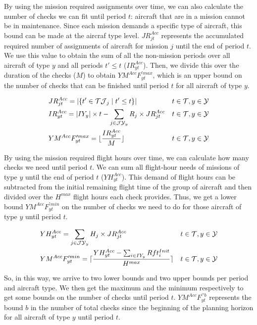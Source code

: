 \documentclass[a4paper,onecolumn,fleqn]{article}
\begin{document}
  By using the mission required assignments over time, we can also calculate the number of checks we can fit until period $t$: aircraft that are in a mission cannot be in maintenance. Since each mission demands a specific type of aircraft, this bound can be made at the aircraf type level. $JR^{Acc}_{jt}$ represents the accumulated required number of assignments of aircraft for mission $j$ until the end of period $t$.
  We use this value to obtain the sum of all the non-mission periods over all aircraft of type $y$ and all periods $t' \le t$ ($IR^{Acc}_{yt}$). Then, we divide this over the duration of the checks ($M$) to obtain $YM^{Acc}F^{\prime max}_{yt}$, which is an upper bound on the number of checks that can be finished until period $t$ for all aircraft of type $y$.

  \begin{align}
    & JR^{Acc}_{jt} = |\{t' \in \mathcal{TJ}_j \mid t' \le t\}| 
        & t \in \mathcal{T}, y \in \mathcal{Y}\notag\\
    & IR^{Acc}_{yt} = |IY_y| \times t -  \sum_{j \in \mathcal{JY}_y} R_j \times JR^{Acc}_{jt} 
        & t \in \mathcal{T}, y \in \mathcal{Y}\notag\\
    & YM^{Acc}F^{\prime max}_{yt} = \lfloor \frac{IR^{Acc}_{yt}}{M} \rfloor 
        & t \in \mathcal{T}, y \in \mathcal{Y}\notag
  \end{align}

  By using the mission required flight hours over time, we can calculate how many checks we need until period $t$. We can sum all flight-hour needs of missions of type $y$ until the end of period $t$ ($YH^{Acc}_{yt}$). This demand of flight hours can be subtracted from the initial remaining flight time of the group of aircraft and then divided over the $H^{max}$ flight hours each check provides. Thus, we get a lower bound $YM^{Acc}F^{\prime min}_{yt}$ on the number of checks we need to do for those aircraft of type $y$ until period $t$.

  \begin{align}
    & YH^{Acc}_{yt} =  \sum_{j \in \mathcal{JY}_y} H_j \times JR^{Acc}_{jt} 
        & t \in \mathcal{T}, y \in \mathcal{Y} \notag\\
    & YM^{Acc}F^{\prime min}_{yt} =  \lceil \frac{YH^{Acc}_{yt} - \sum_{i \in IY_y} Rft^{Init}_i }{H^{max}} \rceil
        & t \in \mathcal{T}, y \in \mathcal{Y} \notag
  \end{align}

  So, in this way, we arrive to two lower bounds and two upper bounds per period and aircraft type. We then get the maximum and the minimum respectively to get some bounds on the number of checks until period $t$. $YM^{Acc}F^{\prime\prime b}_{yt}$ represents the bound $b$ in the number of total checks since the beginning of the planning horizon for all aircraft of type $y$ until period $t$.
\end{document}
